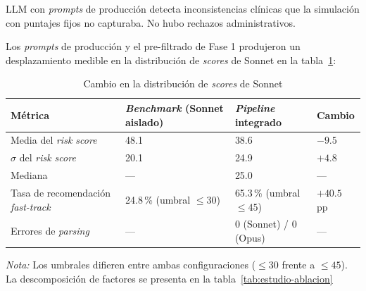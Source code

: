 LLM con \textit{prompts} de producción detecta inconsistencias clínicas que la simulación con puntajes fijos no capturaba. No hubo rechazos administrativos.

Los \textit{prompts} de producción y el pre-filtrado de Fase 1 produjeron un desplazamiento medible en la distribución de \textit{scores} de Sonnet en la tabla~\ref{tab:cambio-distribucion-scores-sonnet}:

\begin{table}[H]
    \centering
    \caption{Cambio en la distribución de \textit{scores} de Sonnet}
    \label{tab:cambio-distribucion-scores-sonnet}

    \footnotesize
    \setlength{\tabcolsep}{6pt}
    \renewcommand{\arraystretch}{1.25}

    \begin{tabular}{
        p{}
        p{}
        p{}
        p{}
    }
        \toprule
        \textbf{Métrica}
        & \textbf{\textit{Benchmark} (Sonnet aislado)}
        & \textbf{\textit{Pipeline} integrado}
        & \textbf{Cambio} \\
        \midrule

        Media del \textit{risk score}
        & 48.1
        & 38.6
        & $-9.5$ \\

        $\sigma$ del \textit{risk score}
        & 20.1
        & 24.9
        & $+4.8$ \\

        Mediana
        & ---
        & 25.0
        & --- \\

        Tasa de recomendación \textit{fast-track}
        & 24.8\,\% (umbral $\leq 30$)
        & 65.3\,\% (umbral $\leq 45$)
        & $+40.5$ pp \\

        Errores de \textit{parsing}
        & ---
        & 0 (Sonnet) / 0 (Opus)
        & --- \\

        \bottomrule
    \end{tabular}

    \vspace{2mm}

    \begin{minipage}{0.94\textwidth}
        \footnotesize
        \textit{Nota:} Los umbrales difieren entre ambas configuraciones
        ($\leq 30$ frente a $\leq 45$). La descomposición de factores se
        presenta en la tabla~\ref{tab:estudio-ablacion}
    \end{minipage}
\end{table}

